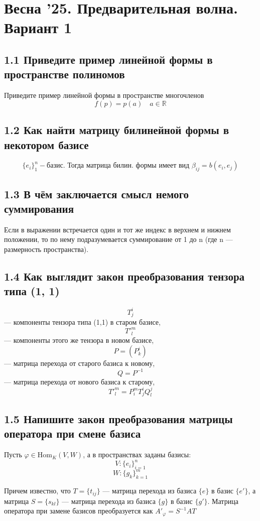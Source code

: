 \documentclass{article}
\begin{document}
\section*{Весна '25. Предварительная волна. Вариант 1}

\subsection*{1.1 Приведите пример линейной формы в пространстве полиномов}
Приведите пример линейной формы в пространстве многочленов
\[f(p) = p(a) \quad a \in \mathbb{R}\]

\subsection*{1.2 Как найти матрицу билинейной формы в некотором базисе}
\[\{e_i\}^n_1 - \text{базис. Тогда матрица билин. формы имеет вид } \beta_{ij} = b(e_i, e_j)\]

\subsection*{1.3 В чём заключается смысл немого суммирования}
Если в выражении встречается один и тот же индекс в верхнем и нижнем положении, то по нему подразумевается суммирование от 1 до n (где n — размерность пространства).

\subsection*{1.4 Как выглядит закон преобразования тензора типа (1, 1)}
\[T^i_j\] — компоненты тензора типа (1,1) в старом базисе,
\[T'^m_l\] — компоненты этого же тензора в новом базисе,
\[P = (P^i_k)\] — матрица перехода от старого базиса к новому,
\[Q = P^{-1}\] — матрица перехода от нового базиса к старому,
\[T'^m_l = P^m_i T^i_j Q^j_l\]

\subsection*{1.5 Напишите закон преобразования матрицы оператора при смене базиса}
Пусть \(\varphi \in \text{Hom}_K(V, W)\), а в пространствах заданы базисы:
\[V : \{e_i\}^n_{i=1}\]
\[W : \{g_k\}^m_{k=1}\]

Причем известно, что \(T = \{t_{ij}\}\) — матрица перехода из базиса \(\{e\}\) в базис \(\{e'\}\), а матрица \(S = \{s_{kl}\}\) — матрица перехода из базиса \(\{g\}\) в базис \(\{g'\}\).
Матрица оператора при замене базисов преобразуется как \(A'_\varphi = S^{-1} A T\)
\end{document}
